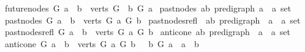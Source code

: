 \begin{isabellebody}
\ \ \ {\isachardoublequoteopen}future{\isacharunderscore}{\kern0pt}nodes\ G\ a\ {\isacharequal}{\kern0pt}\ {\isacharbraceleft}{\kern0pt}b\ {\isasymin}\ verts\ G{\isachardot}{\kern0pt}\ \ b\ {\isasymrightarrow}\isactrlsup {\isacharplus}{\kern0pt}\isactrlbsub G\isactrlesub \ a{\isacharbraceright}{\kern0pt}{\isachardoublequoteclose}\isanewline
\isanewline
{}\isamarkupfalse%
\ past{\isacharunderscore}{\kern0pt}nodes{\isacharcolon}{\kern0pt}{\isacharcolon}{\kern0pt}\ {\isachardoublequoteopen}{\isacharparenleft}{\kern0pt}{\isacharprime}{\kern0pt}a{\isacharcomma}{\kern0pt}{\isacharprime}{\kern0pt}b{\isacharparenright}{\kern0pt}\ pre{\isacharunderscore}{\kern0pt}digraph\ {\isasymRightarrow}{\isacharprime}{\kern0pt}a\ {\isasymRightarrow}\ {\isacharprime}{\kern0pt}a\ set{\isachardoublequoteclose}\isanewline
\ \ \ {\isachardoublequoteopen}past{\isacharunderscore}{\kern0pt}nodes\ G\ a\ {\isacharequal}{\kern0pt}\ {\isacharbraceleft}{\kern0pt}b\ {\isasymin}\ verts\ G{\isachardot}{\kern0pt}\ a\ {\isasymrightarrow}\isactrlsup {\isacharplus}{\kern0pt}\isactrlbsub G\isactrlesub \ b{\isacharbraceright}{\kern0pt}{\isachardoublequoteclose}\isanewline
\isanewline
{}\isamarkupfalse%
\ past{\isacharunderscore}{\kern0pt}nodes{\isacharunderscore}{\kern0pt}refl\ {\isacharcolon}{\kern0pt}{\isacharcolon}{\kern0pt}\ {\isachardoublequoteopen}{\isacharparenleft}{\kern0pt}{\isacharprime}{\kern0pt}a{\isacharcomma}{\kern0pt}{\isacharprime}{\kern0pt}b{\isacharparenright}{\kern0pt}\ pre{\isacharunderscore}{\kern0pt}digraph\ {\isasymRightarrow}\ {\isacharprime}{\kern0pt}a\ {\isasymRightarrow}\ {\isacharprime}{\kern0pt}a\ set{\isachardoublequoteclose}\isanewline
\ \ \ {\isachardoublequoteopen}past{\isacharunderscore}{\kern0pt}nodes{\isacharunderscore}{\kern0pt}refl\ G\ a\ {\isacharequal}{\kern0pt}\ {\isacharbraceleft}{\kern0pt}b\ {\isasymin}\ verts\ G{\isachardot}{\kern0pt}\ a\ {\isasymrightarrow}\isactrlsup {\isacharasterisk}{\kern0pt}\isactrlbsub G\isactrlesub \ b{\isacharbraceright}{\kern0pt}{\isachardoublequoteclose}\isanewline
\isanewline
{}\isamarkupfalse%
\ anticone{\isacharcolon}{\kern0pt}{\isacharcolon}{\kern0pt}\ {\isachardoublequoteopen}{\isacharparenleft}{\kern0pt}{\isacharprime}{\kern0pt}a{\isacharcomma}{\kern0pt}{\isacharprime}{\kern0pt}b{\isacharparenright}{\kern0pt}\ pre{\isacharunderscore}{\kern0pt}digraph\ {\isasymRightarrow}\ {\isacharprime}{\kern0pt}a\ {\isasymRightarrow}\ {\isacharprime}{\kern0pt}a\ set{\isachardoublequoteclose}\isanewline
\ \ \ {\isachardoublequoteopen}anticone\ G\ a\ {\isacharequal}{\kern0pt}\ {\isacharbraceleft}{\kern0pt}b\ {\isasymin}\ verts\ G{\isachardot}{\kern0pt}\ {\isasymnot}{\isacharparenleft}{\kern0pt}a\ {\isasymrightarrow}\isactrlsup {\isacharplus}{\kern0pt}\isactrlbsub G\isactrlesub \ b\ {\isasymor}\ \ b\ {\isasymrightarrow}\isactrlsup {\isacharplus}{\kern0pt}\isactrlbsub G\isactrlesub \ a\ {\isasymor}\ a\ {\isacharequal}{\kern0pt}\ b{\isacharparenright}{\kern0pt}{\isacharbraceright}{\kern0pt}{\isachardoublequoteclose}\ \isanewline

\end{isabellebody}
